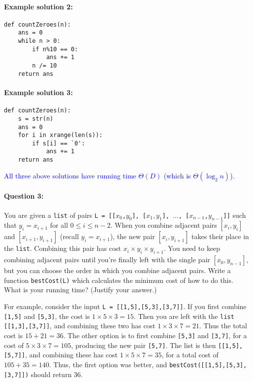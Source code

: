 \documentclass[11pt]{article}
\newcommand{\sol}[1]{\textcolor{blue}{#1}}
\begin{document}
\paragraph{Example solution 2:}
\begin{verbatim}
def countZeroes(n):
    ans = 0
    while n > 0:
        if n%10 == 0:
            ans += 1
        n /= 10
    return ans
\end{verbatim}

\paragraph{Example solution 3:}
\begin{verbatim}
def countZeroes(n):
    s = str(n)
    ans = 0
    for i in xrange(len(s)):
        if s[i] == `0':
            ans += 1
    return ans
\end{verbatim}

\noindent \sol{All three above solutions have running time $\Theta(D)$
  (which is $\Theta(\log_2 n)$).}


\newpage


\paragraph{Question 3:}
You are given a \texttt{list} of pairs \texttt{L = [[$x_0$,$y_0$],
  [$x_1,y_1$], $\ldots$, [$x_{n-1}$,$y_{n-1}$]]} such that $y_i =
x_{i+1}$ for all $0\le i \le n-2$.  When you combine adjacent pairs
\texttt{$[x_i,y_i]$} and \texttt{$[x_{i+1},y_{i+1}]$} (recall
\texttt{$y_i = x_{i+1}$}), the new pair
\texttt{$[x_i,y_{i+1}]$} takes their place in the \texttt{list}.
Combining this pair has cost $x_i\times y_i
\times y_{i+1}$.  You need to keep combining adjacent pairs until
you're finally left with the single pair \texttt{$[x_0,y_{n-1}]$}, but
you can choose the order in which you combine adjacent pairs.
Write a function \texttt{bestCost(L)} which calculates the minimum
cost of how to do this. 
What is your running time? (Justify your answer.)

For example, consider the input \texttt{L = [[1,5],[5,3],[3,7]]}. If
you first combine \texttt{[1,5]} and \texttt{[5,3]}, the cost is
$1\times 5\times 3 = 15$.  Then you are left with the \texttt{list}
\texttt{[[1,3],[3,7]]}, and combining these two has cost $1\times
3\times 7 = 21$.  Thus the total cost is $15 + 21 = 36$.  The other
option is to first combine \texttt{[5,3]} and \texttt{[3,7]}, for a
cost of $5\times 3\times 7 = 105$, producing the new pair
\texttt{[5,7]}.  The list is then \texttt{[[1,5],[5,7]]}, and
combining these has cost $1\times 5\times 7 = 35$, for a total cost of
$105 + 35 = 140$.  Thus, the first option was better, and
\texttt{bestCost([[1,5],[5,3],[3,7]])} should return $36$.
\end{document}
